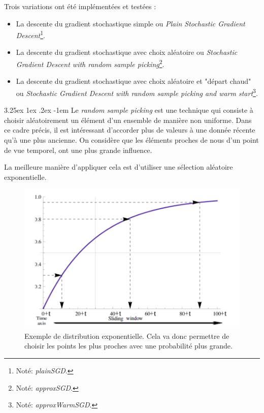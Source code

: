 \documentclass[a4paper, 11pt]{article}
\makeatletter
\renewcommand\paragraph{\@startsection{paragraph}{5}{\z@}%
  {3.25ex \@plus1ex \@minus.2ex}%
  {-1em}%
  {\normalfont\normalsize\bfseries}}
\makeatother
\begin{document}
Trois variations ont été implémentées et testées :
\begin{itemize}
\item La descente du gradient stochastique simple ou \textit{Plain Stochastic Gradient Descent}\footnote{Noté: \textit{plainSGD}.}.
\item La descente du gradient stochastique avec choix aléatoire ou \textit{Stochastic Gradient Descent with random sample picking}\footnote{Noté: \textit{approxSGD}.}.
\item La descente du gradient stochastique avec choix aléatoire et "départ chaud" ou \textit{Stochastic Gradient Descent with random sample picking and warm start}\footnote{Noté: \textit{approxWarmSGD}.}.
\end{itemize}

\paragraph{}
Le \textit{random sample picking} est une technique qui consiste à choisir aléatoirement un élément d'un ensemble de manière non uniforme. Dans ce cadre précis, il est intéressant d'accorder plus de valeurs à une donnée récente qu'à une plus ancienne. On considère que les éléments proches de nous d'un point de vue temporel, ont une plus grande influence.

La meilleure manière d'appliquer cela est d'utiliser une sélection aléatoire exponentielle.

\begin{figure}[H]
\centering
\includegraphics[scale=0.40]{images/choix_exp}
\caption[]{Exemple de distribution exponentielle\footnotemark. Cela va donc permettre de choisir les points les plus proches avec une probabilité plus grande.}
\end{figure}
\end{document}
